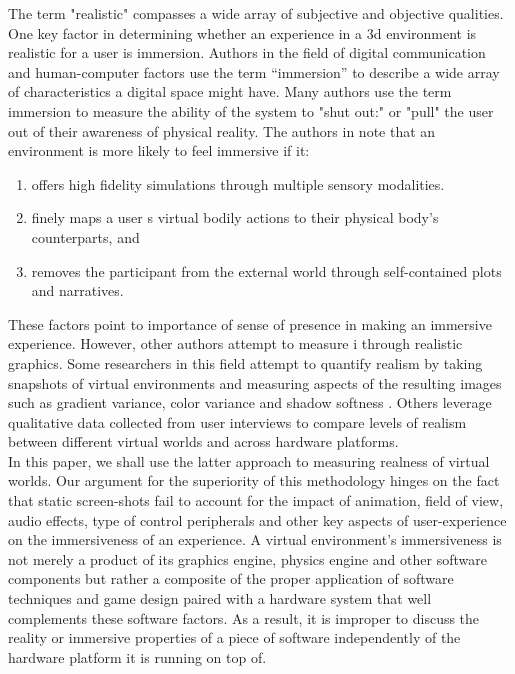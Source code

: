 The term "realistic" compasses a wide array of subjective and objective qualities. One key factor in determining whether an experience in a 3d environment is realistic for a user is immersion. Authors in the field of digital communication and human-computer factors use the term “immersion” to describe a wide array of characteristics a digital space might have. Many authors use the term immersion to measure the ability of the system to "shut out:" or "pull" the user out of their awareness of physical reality. The authors in \citep{Cummings_2015}
 note that an environment is more likely to feel immersive if it:
 \begin{enumerate}


\item offers high fidelity simulations
through multiple sensory modalities. \item finely maps a user
s virtual bodily
actions to their physical body's counterparts, and \item removes the participant
from the external world through self-contained plots and narratives. 
 \end{enumerate}
These factors point to importance of sense of presence in making an immersive experience. However, other authors attempt to measure i through realistic graphics. Some researchers in this field attempt to quantify realism by taking snapshots of virtual environments and measuring aspects of the resulting images such as gradient variance, color variance and shadow
softness \cite{Wang:2011:RRP:2013879.2014089}. Others leverage qualitative data collected from user interviews to compare levels of realism between different virtual worlds and across hardware platforms.
\\

 In this paper, we shall use the latter approach to measuring realness of virtual worlds. Our argument for the superiority of this methodology hinges on the fact that static screen-shots fail to account for the impact of animation, field of view, audio effects, type of control peripherals and other key aspects of user-experience on the immersiveness of an experience. A virtual environment's immersiveness is not merely a product of its graphics engine, physics engine and other software components but rather a composite of the proper application of software techniques and game design paired with a hardware system that well complements these software factors. As a result, it is improper to discuss the reality or immersive properties of
a piece of software independently of the hardware platform it is running on top of. 
